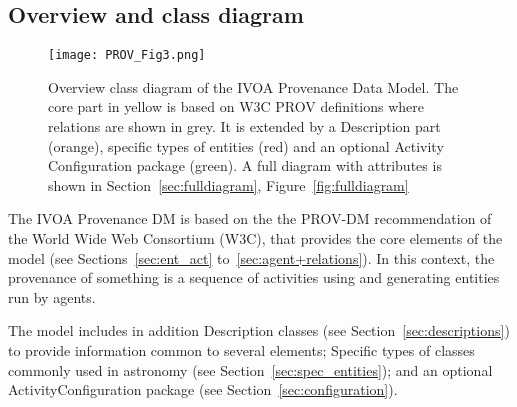 

\subsection{Overview and class diagram}
\label{sec:overview}



\begin{figure}[hbt]
\centering
\texttt{[image: PROV\_Fig3.png]}
\caption[Overview class diagram of the IVOA Provenance Data Model]{Overview class diagram of the IVOA Provenance Data Model. The core part in yellow is based on W3C PROV definitions where relations are shown in grey. It is extended by a Description part (orange), specific types of entities (red) and an optional Activity Configuration package (green). A full diagram with attributes is shown in Section~\ref{sec:fulldiagram}, Figure~\ref{fig:fulldiagram}}
\label{fig:overview}
\end{figure}

The IVOA Provenance DM is based on the the PROV-DM recommendation \citep{std:W3CProvDM} of the World Wide Web Consortium (W3C), that provides the core elements of the model (see Sections~\ref{sec:ent_act} to~\ref{sec:agent+relations}). 
In this context, the provenance of something is a sequence of activities using and generating entities run by agents.

The model includes in addition Description classes (see Section~\ref{sec:descriptions}) to provide information common to several elements; Specific types of  classes commonly used in astronomy (see Section~\ref{sec:spec_entities}); and an optional ActivityConfiguration package (see Section~\ref{sec:configuration}).

